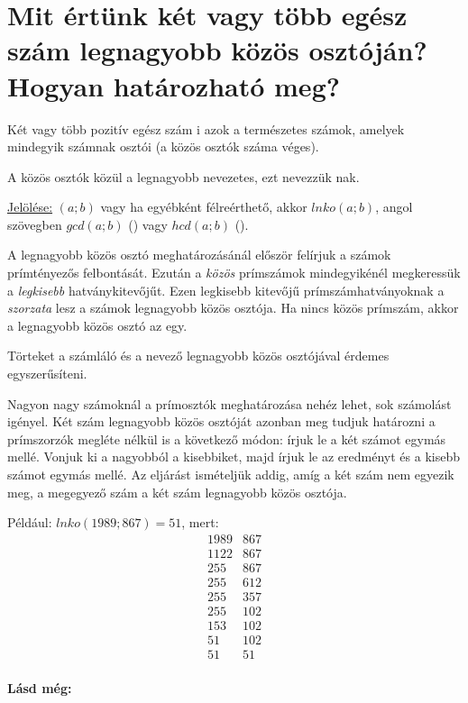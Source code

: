 
\section{Mit értünk két vagy több egész szám legnagyobb közös osztóján?
\texorpdfstring{\\}{}Hogyan határozható meg?}
\label{001}

\begin{defin}
Két vagy több pozitív egész szám i azok a természetes
számok, amelyek mindegyik számnak osztói (a közös osztók száma véges).
\end{defin}

\begin{defin}
A közös osztók közül a legnagyobb nevezetes, ezt nevezzük nak.

\uline{Jelölése:} $(a; b)$ vagy ha egyébként félreérthető, akkor $lnko(a; b)$,
angol szövegben $gcd(a; b)$ () vagy $hcd(a;
b)$ ().
\end{defin}

\begin{method}
A legnagyobb közös osztó meghatározásánál először felírjuk a számok
prímtényezős felbontását. Ezután a \emph{közös} prímszámok mindegyikénél
megkeressük a \emph{legkisebb} hatványkitevőjűt. Ezen legkisebb kitevőjű
prímszámhatványoknak a \emph{szorzata} lesz a számok legnagyobb közös osztója.
Ha nincs közös prímszám, akkor a legnagyobb közös osztó az egy.
\end{method}

\begin{note2}
Törteket a számláló és a nevező legnagyobb közös osztójával érdemes
egyszerűsíteni.
\end{note2}

\begin{method4}
Nagyon nagy számoknál a prímosztók meghatározása nehéz lehet, sok számolást
igényel. Két szám legnagyobb közös osztóját azonban meg tudjuk határozni a
prímszorzók megléte nélkül is a következő módon: írjuk le a két számot egymás
mellé. Vonjuk ki a nagyobból a kisebbiket, majd írjuk le az eredményt és a
kisebb számot egymás mellé. Az eljárást ismételjük addig, amíg a két szám nem
egyezik meg, a megegyező szám a két szám legnagyobb közös osztója.

Például: $lnko(1989; 867) = 51$, mert:
\[
\begin{array}{r|l}
  1989 & 867 \\
  1122 & 867 \\
  255 & 867 \\
  255 & 612 \\
  255 & 357 \\
  255 & 102 \\
  153 & 102 \\
  51 & 102 \\
  51 & 51 \\
\end{array}
\]
\end{method4}

\textbf{Lásd még:}
